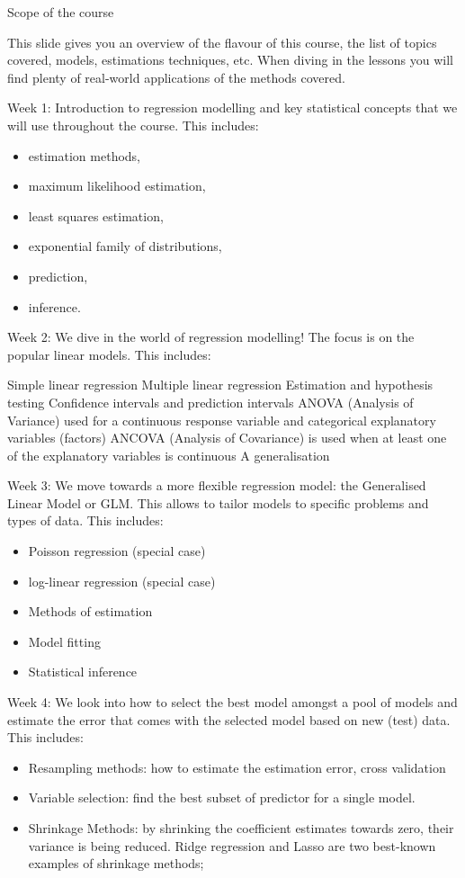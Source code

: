 \documentclass[11pt]{article}
\begin{document}
Scope of the course

This slide gives you an overview of the flavour of this course, the list of topics covered, models, estimations techniques, etc. When diving in the lessons you will find plenty of real-world applications of the methods covered.

Week 1:
Introduction to regression modelling and key statistical concepts that we will use throughout the course.
This includes:
\begin{itemize}
    \item estimation methods,
    \item maximum likelihood estimation,
    \item least squares estimation,
    \item exponential family of distributions,
    \item prediction,
    \item inference.
\end{itemize}

Week 2:
We dive in the world of regression modelling!
The focus is on the popular linear models.
This includes:
\begin{itemize}
    Simple linear regression
    Multiple linear regression
    Estimation and hypothesis testing
    Confidence intervals and prediction intervals
    ANOVA (Analysis of Variance) used for a continuous response variable and categorical explanatory variables (factors)
    ANCOVA (Analysis of Covariance) is used when at least one of the explanatory variables is continuous
    A generalisation
\end{itemize}

Week 3:
We move towards a more flexible regression model: the Generalised Linear Model or GLM. This allows to tailor models to specific problems and types of data.
This includes:
\begin{itemize}
Logistic regression (special case)
    \item Poisson regression (special case)
    \item log-linear regression (special case)
    \item Methods of estimation
    \item Model fitting
    \item Statistical inference
\end{itemize}

Week 4:
We look into how to select the best model amongst a pool of models and estimate the error that comes with the selected model based on new (test) data. This includes:
\begin{itemize}
    \item Resampling methods: how to estimate the estimation error, cross validation
    \item Variable selection: find the best subset of predictor for a single model.
    \item Shrinkage Methods: by shrinking the coefficient estimates towards zero, their variance is being reduced. Ridge regression and Lasso are two best-known examples of shrinkage methods;
\end{itemize}
\end{document}
